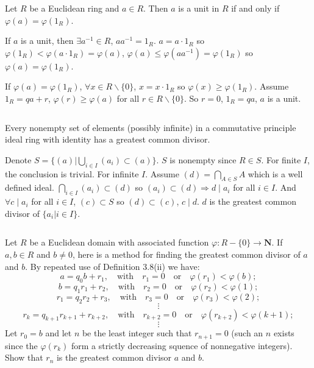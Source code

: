 $$ $$

\begin{ex}
    Let $R$ be a Euclidean ring and $a\in R$. Then $a$ is a unit in $R$ if and only if $\varphi(a)=\varphi(1_{R})$.
\end{ex}

\begin{answer}
    If $a$ is a unit, then $\exists a^{-1}\in R$, $aa^{-1}=1_{R}$. $a=a\cdot 1_{R}$ so $\varphi(1_{R})<\varphi(a\cdot 1_{R})=\varphi(a)$, $\varphi(a)\leq \varphi(aa^{-1})=\varphi(1_{R})$ so $\varphi(a)=\varphi(1_{R})$.

    If $\varphi(a)=\varphi(1_{R})$, $\forall x\in R\backslash \{0\}$, $x=x\cdot 1_{R}$ so $\varphi(x)\geq \varphi(1_{R})$. Assume $1_{R}=qa+r$, $\varphi(r)\geq \varphi(a)$ for all $r\in R\backslash\{0\}$. So $r=0$, $1_{R}=qa$, $a$ is a unit.
\end{answer}

$$ $$

\begin{ex}
    Every nonempty set of elements (possibly infinite) in a commutative principle ideal ring with identity has a greatest common divisor.
\end{ex}

\begin{answer}
    Denote $S=\{(a)|\bigcup\limits_{i\in I}(a_{i})\subset (a)\}$. $S$ is nonempty since $R\in S$. For finite $I$, the conclusion is trivial. For infinite $I$. Assume $(d)= \bigcap\limits_{A\in S}A$ which is a well defined ideal. $\bigcap\limits_{i\in I}(a_{i})\subset(d)$ so $(a_{i})\subset (d)\Rightarrow d\mid a_{i}$ for all $i\in I$. And $\forall c\mid a_{i}$ for all $i\in I$, $(c)\subset S$ so $(d)\subset (c)$, $c\mid d$. $d$ is the greatest common divisor of $\{a_{i}|i\in I\}$.
\end{answer}

$$ $$

\begin{ex}
    Let $R$ be a Euclidean domain with associated function $\varphi :R-\{0\}\to \mathbf{N}$. If $a,b\in R$ and $b\neq 0$, here is a method for finding the greatest common divisor of $a$ and $b$. By repeated use of Definition 3.8(ii) we have:
    \[a=q_{0}b+r_{1},\quad\text{with}\quad r_{1}=0\quad\text{or}\quad\varphi(r_{1})<\varphi(b);\]
    \[b=q_{1}r_{1}+r_{2},\quad\text{with}\quad r_{2}=0\quad\text{or}\quad\varphi(r_{2})<\varphi(1);\]
    \[r_{1}=q_{2}r_{2}+r_{3},\quad\text{with}\quad r_{3}=0\quad\text{or}\quad\varphi(r_{3})<\varphi(2);\]
    \[\vdots\]
    \[r_{k}=q_{k+1}r_{k+1}+r_{k+2},\quad\text{with}\quad r_{k+2}=0\quad\text{or}\quad\varphi(r_{k+2})<\varphi(k+1);\]
    \[\vdots\]
    Let $r_{0}=b$ and let $n$ be the least integer such that $r_{n+1}=0$ (such an $n$ exists since the $\varphi(r_{k})$ form a strictly decreasing squence of nonnegative integers). Show that $r_{n}$ is the greatest common divisor $a$ and $b$.
\end{ex}

